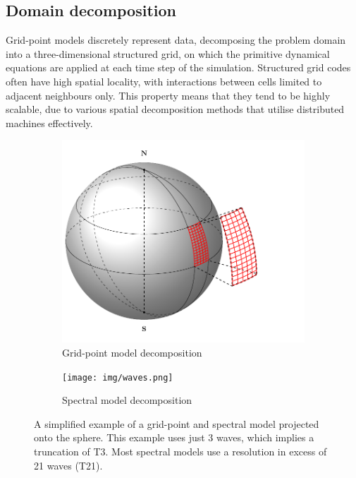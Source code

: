 \documentclass[a4paper,11pt]{report}
\begin{document}
\subsection{Domain decomposition}
\label{sec:spectral-domain}
Grid-point models discretely represent data,  decomposing the problem domain into a three-dimensional structured grid, on which the primitive dynamical equations are applied at each time step of the simulation. Structured grid codes often have high spatial locality, with interactions between cells limited to adjacent neighbours only. This property means that they tend to be highly scalable, due to various spatial decomposition methods that utilise distributed machines effectively. 
\begin{figure}[htbp]
\centering
\begin{subfigure}{.5\textwidth}
  \centering
  \includegraphics[width=.99\linewidth]{img/sphere-decomp.pdf}
  \caption{Grid-point model decomposition}
  \label{fig:sub1}
\end{subfigure}%
\begin{subfigure}{.5\textwidth}
  \centering
  \texttt{[image: img/waves.png]}
  \caption{Spectral model decomposition}
  \label{fig:sub2}
\end{subfigure}
\caption[Grid-point and spectral domain decomposition]{A simplified example of a grid-point and spectral model projected onto the sphere. This example uses just 3 waves, which implies a truncation of T3. Most spectral models use a resolution in excess of 21 waves (T21). }
\label{fig:test}
\end{figure}
\end{document}
